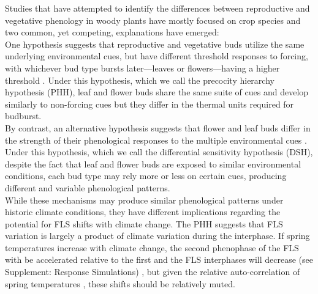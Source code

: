 \documentclass[11pt]{article}
\begin{document}
\noindent Studies that have attempted to identify the differences between reproductive and vegetative phenology in woody plants have mostly focused on crop species and two common, yet competing, explanations have emerged:\\

\noindent One hypothesis suggests that reproductive and vegetative buds utilize the same underlying environmental cues, but have different threshold responses to forcing, with whichever bud type bursts later---leaves or flowers---having a higher threshold \citep{Guo2014,COSMULESCU:2020aa,Cosmulescu:2018aa}. Under this hypothesis, which we call the precocity hierarchy hypothesis (PHH), leaf and flower buds share the same suite of cues and develop similarly to non-forcing cues but they differ in the thermal units required for budburst.\\

\noindent By contrast, an alternative hypothesis suggests that flower and leaf buds differ in the strength of their phenological responses to the multiple environmental cues \citep{Citadin2001,Gariglio2006,Aslani2009,Mehlenbacher:1991aa}. Under this hypothesis, which we call the differential sensitivity hypothesis (DSH), despite the fact that leaf and flower buds are exposed to similar environmental conditions, each bud type may rely more or less on certain cues, producing different and variable phenological patterns.\\

\noindent While these mechanisms may produce similar phenological patterns under historic climate conditions, they have different implications regarding the potential for FLS shifts with climate change. The PHH suggests that FLS variation is largely a product of climate variation during the interphase. If spring temperatures increase with climate change, the second phenophase of the FLS with be accelerated relative to the first and the FLS interphases will decrease (see Supplement: Response Simulations) , but given the relative auto-correlation of spring temperatures \citep{Di-Cecco:2018aa}, these shifts should be relatively muted. \\
\end{document}
